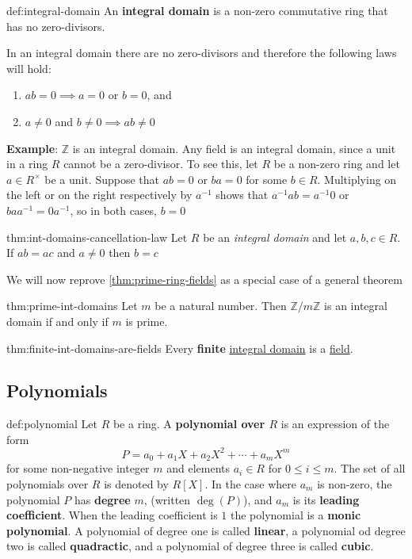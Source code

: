 \documentclass{article}
\begin{document}
\begin{dfn}{def:integral-domain}{}
    An \textbf{integral domain} is a non-zero commutative ring that has no zero-divisors.

    In an integral domain there are no zero-divisors and therefore the following laws will hold:
    \begin{enumerate}
        \item $ab = 0 \implies a = 0$ or $b = 0$, and
        \item $a\ne 0$ and $b\ne 0 \implies ab \ne 0$ 
    \end{enumerate}
\end{dfn}

\textbf{Example}: $\mathbb{Z}$ is an integral domain. Any field is an integral domain, since a unit in a ring $R$ cannot be a zero-divisor. To see this, let $R$ be a non-zero ring and let $a\in R^{\times}$ be a unit. Suppose that $ab = 0$ or $ba = 0$ for some $b\in R$. Multiplying on the left or on the right respectively by $a^{-1}$ shows that $a^{-1} ab = a^{-1} 0$ or $baa^{-1} = 0 a^{-1}$, so in both cases, $b = 0$

\begin{thm}{thm:int-domains-cancellation-law}{}
    Let $R$ be an \textit{integral domain} and let $a,b,c\in R$. If $ab = ac$ and $a\ne 0$ then $b = c$
\end{thm}

We will now reprove \ref{thm:prime-ring-fields} as a special case of a general theorem

\begin{thm}{thm:prime-int-domains}{}
    Let $m$ be a natural number. Then $\mathbb{Z} / m\mathbb{Z}$ is an integral domain if and only if $m$ is prime.
\end{thm}

\begin{thm}{thm:finite-int-domains-are-fields}{}
    Every \textbf{finite} \hyperref[def:integral-domain]{integral domain} is a \hyperref[def:field]{field}.
\end{thm}


\subsection{Polynomials}

\begin{dfn}[Polynomial]{def:polynomial}{}
    Let $R$ be a ring. A \textbf{polynomial over $R$} is an expression of the form
    \[P = a_{0} + a_{1}X + a_{2}X^{2} + \cdots + a_{m}X^{m}\]
    for some non-negative integer $m$ and elements $a_{i}\in R$ for $0 \le i \le m$. The set of all polynomials over $R$ is denoted by $R[X]$. In the case where $a_{m}$ is non-zero, the polynomial $P$ has \textbf{degree} $m$, (written $\deg(P)$), and $a_{m}$ is its \textbf{leading coefficient}. When the leading coefficient is $1$ the polynomial is a \textbf{monic polynomial}. A polynomial of degree one is called \textbf{linear}, a polynomial od degree two is called \textbf{quadractic}, and a polynomial of degree three is called \textbf{cubic}.
\end{dfn}
\end{document}
